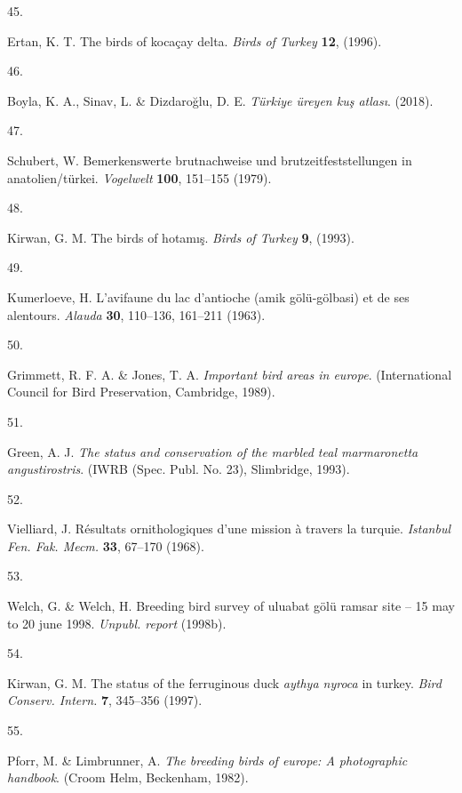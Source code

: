 \documentclass[
  letterpaper,
  DIV=11,
  numbers=noendperiod]{scrreprt}
\newlength{\cslhangindent}
\newlength{\csllabelwidth}
\newenvironment{CSLReferences}[2] %
 {\begin{list}{}{%
  \setlength{\itemindent}{0pt}
  \setlength{\leftmargin}{0pt}
  \setlength{\parsep}{0pt}
  \ifodd #1
   \setlength{\leftmargin}{\cslhangindent}
   \setlength{\itemindent}{-1\cslhangindent}
  \fi
  \setlength{\itemsep}{#2\baselineskip}}}
 {\end{list}}
\newcommand{\CSLLeftMargin}[1]{\parbox[t]{\csllabelwidth}{\strut#1\strut}}
\newcommand{\CSLRightInline}[1]{\parbox[t]{\linewidth - \csllabelwidth}{\strut#1\strut}}
\begin{document}
\begin{CSLReferences}{0}{0}
\CSLLeftMargin{45. }%
\CSLRightInline{Ertan, K. T. The birds of kocaçay delta. \emph{Birds of
Turkey} \textbf{12}, (1996).}

\CSLLeftMargin{46. }%
\CSLRightInline{Boyla, K. A., Sinav, L. \& Dizdaroğlu, D. E.
\emph{Türkiye üreyen kuş atlası}. (2018).}

\CSLLeftMargin{47. }%
\CSLRightInline{Schubert, W. Bemerkenswerte brutnachweise und
brutzeitfeststellungen in anatolien/türkei. \emph{Vogelwelt}
\textbf{100}, 151--155 (1979).}

\CSLLeftMargin{48. }%
\CSLRightInline{Kirwan, G. M. The birds of hotamış. \emph{Birds of
Turkey} \textbf{9}, (1993).}

\CSLLeftMargin{49. }%
\CSLRightInline{Kumerloeve, H. L'avifaune du lac d'antioche (amik
gölü-gölbasi) et de ses alentours. \emph{Alauda} \textbf{30}, 110--136,
161--211 (1963).}

\CSLLeftMargin{50. }%
\CSLRightInline{Grimmett, R. F. A. \& Jones, T. A. \emph{Important bird
areas in europe}. (International Council for Bird Preservation,
Cambridge, 1989).}

\CSLLeftMargin{51. }%
\CSLRightInline{Green, A. J. \emph{The status and conservation of the
marbled teal marmaronetta angustirostris}. (IWRB (Spec. Publ. No. 23),
Slimbridge, 1993).}

\CSLLeftMargin{52. }%
\CSLRightInline{Vielliard, J. Résultats ornithologiques d'une mission à
travers la turquie. \emph{Istanbul Fen. Fak. Mecm.} \textbf{33}, 67--170
(1968).}

\CSLLeftMargin{53. }%
\CSLRightInline{Welch, G. \& Welch, H. Breeding bird survey of uluabat
gölü ramsar site -- 15 may to 20 june 1998. \emph{Unpubl. report}
(1998b).}

\CSLLeftMargin{54. }%
\CSLRightInline{Kirwan, G. M. The status of the ferruginous duck
\emph{aythya nyroca} in turkey. \emph{Bird Conserv. Intern.} \textbf{7},
345--356 (1997).}

\CSLLeftMargin{55. }%
\CSLRightInline{Pforr, M. \& Limbrunner, A. \emph{The breeding birds of
europe: A photographic handbook}. (Croom Helm, Beckenham, 1982).}


\end{CSLReferences}
\end{document}
